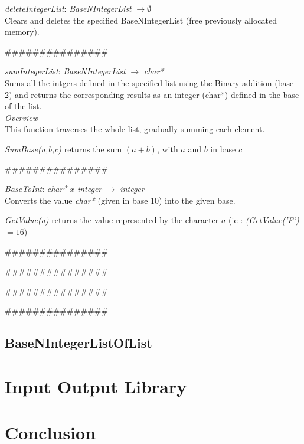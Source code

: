 \documentclass[backcover, english, report, nodocumentinfo]{upmethodology-document}
\newcommand{\nxtalgo}{\centerline{$$$$\#\#\#\#\#\#\#\#\#\#\#\#\#\#\#$$$$}}
\newcommand{\ov}{\emph{Overview}}
\begin{document}
		\begin{minipage}{\linewidth}
			\emph{deleteIntegerList}: \emph{BaseNIntegerList} \(\rightarrow \emptyset\)\\
				Clears and deletes the specified BaseNIntegerList (free previously allocated memory).\\
			\label{algo:BNIL-DeleteIntegerList}
			
		\end{minipage}
		\nxtalgo

		\begin{minipage}{\linewidth}
			\emph{sumIntegerList}: \emph{BaseNIntegerList} \(\rightarrow\) \emph{char*}\\
				Sums all the intgers defined in the specified list using the Binary addition (base 2)
				and returns the corresponding results as an integer (char*) defined in the base of the list.\\
			\ov\\
			This function traverses the whole list, gradually summing each element.
			\label{algo:BNIL-SumIntegerList}
			
			\emph{SumBase(a,b,c)} returns the sum \((a+b)\), with \(a\) and \(b\) in base \(c\)
		\end{minipage}
		\nxtalgo

		\begin{minipage}{\linewidth}
			\emph{BaseToInt}: \emph{char*} \(x\) \emph{integer} \(\rightarrow\) \emph{integer}\\
				Converts the value \emph{char*} (given in base 10) into the given base.
			\label{algo:BNIL-BaseToInt}
			
			\emph{GetValue(a)} returns the value represented by the character \(a\)
			(ie : \emph{(GetValue('F')} \(= 16\))
		\end{minipage}
		\nxtalgo

		\begin{minipage}{\linewidth}
			\label{algo:BNIL-IntToBase}
			
		\end{minipage}
		\nxtalgo

		\begin{minipage}{\linewidth}
			\label{algo:BNIL-ConvertBaseToBinary}
			
		\end{minipage}
		\nxtalgo

		\begin{minipage}{\linewidth}
			\label{algo:BNIL-ConvertBinaryToBase}
			
		\end{minipage}
		\nxtalgo

		\begin{minipage}{\linewidth}
			\label{algo:BNIL-SumBase}
			
		\end{minipage}
	\section{BaseNIntegerListOfList}
\chapter{Input Output Library}
\chapter{Conclusion}
\end{document}
